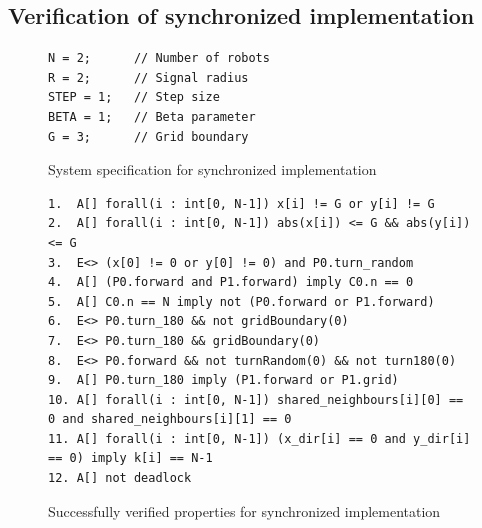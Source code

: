 \subsection{Verification of synchronized implementation}
\begin{figure}[H]
\caption{System specification for synchronized implementation}
\label{fig:implementation_synchronised_system}
\begin{lstlisting}[style=code]
N = 2;      // Number of robots
R = 2;      // Signal radius
STEP = 1;   // Step size
BETA = 1;   // Beta parameter
G = 3;      // Grid boundary
\end{lstlisting}
\end{figure}

\begin{figure}[H]
\caption{Successfully verified properties for synchronized implementation}
\label{fig:implementation_synchronised_properties}
\begin{lstlisting}[style=code]
1.  A[] forall(i : int[0, N-1]) x[i] != G or y[i] != G
2.  A[] forall(i : int[0, N-1]) abs(x[i]) <= G && abs(y[i]) <= G
3.  E<> (x[0] != 0 or y[0] != 0) and P0.turn_random
4.  A[] (P0.forward and P1.forward) imply C0.n == 0
5.  A[] C0.n == N imply not (P0.forward or P1.forward)
6.  E<> P0.turn_180 && not gridBoundary(0)
7.  E<> P0.turn_180 && gridBoundary(0)
8.  E<> P0.forward && not turnRandom(0) && not turn180(0)
9.  A[] P0.turn_180 imply (P1.forward or P1.grid)
10. A[] forall(i : int[0, N-1]) shared_neighbours[i][0] == 0 and shared_neighbours[i][1] == 0
11. A[] forall(i : int[0, N-1]) (x_dir[i] == 0 and y_dir[i] == 0) imply k[i] == N-1
12. A[] not deadlock
\end{lstlisting}    
\end{figure}

